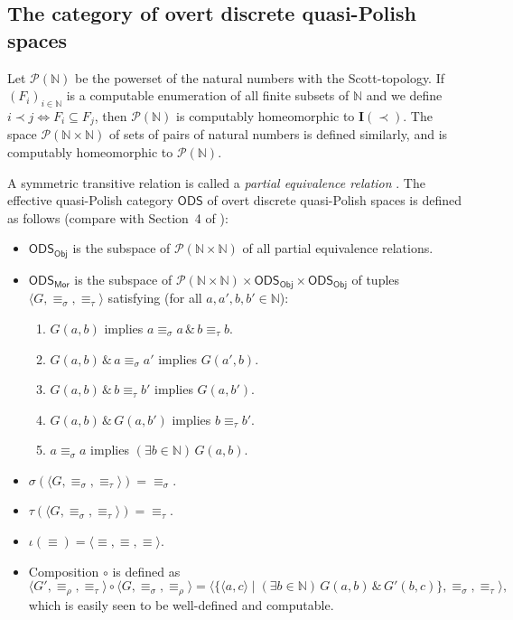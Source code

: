 \documentclass[envcountsame]{llncs}
\def\IN{{\mathbb N}}
\def\calP{{\mathcal{P}}}
\def\I#1{{{\mathrm{\mathbf I}}(#1)}}
\newcommand{\cntSets}{{\mathsf{ODS}}}
\newcommand{\Mor}{\mathsf{Mor}}
\newcommand{\Obj}{\mathsf{Obj}}
\def\src{{\sigma}}
\def\tar{{\tau}}
\def\id{{\iota}}
\begin{document}
\subsection{The category of overt discrete quasi-Polish spaces}

Let $\calP(\IN)$ be the powerset of the natural numbers with the Scott-topology. If $(F_i)_{i\in\IN}$ is a computable enumeration of all finite subsets of $\IN$ and we define $i\prec j \iff F_i\subseteq F_j$, then $\calP(\IN)$ is computably homeomorphic to $\I{\prec}$. The space $\calP(\IN\times\IN)$ of sets of pairs of natural numbers is defined similarly, and is computably homeomorphic to $\calP(\IN)$.

A symmetric transitive relation is called a \emph{partial equivalence relation} \cite{J99}. The effective quasi-Polish category $\cntSets$ of overt discrete quasi-Polish spaces is defined as follows (compare with Section~4 of \cite{Chen19}):

\begin{itemize}
\item
$\cntSets_\Obj$ is the subspace of $\calP(\IN\times\IN)$ of all partial equivalence relations.
\item
$\cntSets_\Mor$ is the subspace of $\calP(\IN\times \IN) \times\cntSets_\Obj\times\cntSets_\Obj$ of tuples $\langle G, \equiv_\src, \equiv_\tar\rangle$  satisfying (for all $a,a',b,b'\in\IN$):
\begin{enumerate}
\item
$G(a,b)$ implies $a\equiv_\src a \,\&\, b\equiv_\tar b$.
\item
$G(a,b) \,\&\, a\equiv_\src a'$ implies $G(a',b)$.
\item
$G(a,b) \,\&\, b\equiv_\tar b'$ implies $G(a,b')$.
\item
$G(a,b) \,\&\, G(a,b')$ implies $b\equiv_\tar b'$.
\item
$a\equiv_\src a$ implies $(\exists b\in\IN)\, G(a,b)$.
\end{enumerate}
\item
$\src(\langle G, \equiv_\src, \equiv_\tar\rangle) = \equiv_\src$.
\item
$\tar(\langle G, \equiv_\src, \equiv_\tar\rangle) = \equiv_\tar$.
\item
$\id(\equiv)=\langle \equiv, \equiv, \equiv\rangle$.
\item
Composition $\circ$ is defined as 
\[\langle G', \equiv_\rho, \equiv_\tar\rangle \circ \langle G, \equiv_\src, \equiv_\rho\rangle = \langle \{\langle a,c\rangle\mid (\exists b\in\IN)\, G(a,b) \,\&\, G'(b,c)\} , \equiv_\src, \equiv_\tar\rangle,\]
which is easily seen to be well-defined and computable.
\end{itemize}
\end{document}

